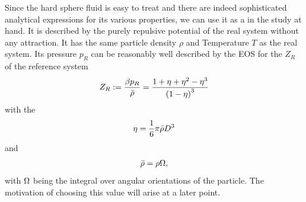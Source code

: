 \documentclass[8.5pt,twoside,twocolumn]{article}
\theoremstyle{standard}
\begin{document}
Since the hard sphere fluid is easy to treat and there are indeed sophisticated analytical
expressions for its various properties, we can use it as a  in the
study at hand. It is described by the purely repulsive potential of the real system
without any attraction. It has the same particle density $\rho$ and Temperature $T$ as the
real system. Its pressure $p_R$ can be reasonably well described by the 
EOS\cite{CarnahanStarling} for the  $Z_R$ of the reference system
\begin{equation}
Z_R:=\frac{\beta p_R}{\bar\rho}=\frac{1+\eta+\eta^2-\eta^3}{\left({1-\eta}\right)^3}
\label{TPT:CSEOS}
\end{equation}
with the 
\begin{equation}
\eta=\frac 1 6 \pi\bar\rho D^3
\label{TPT:eta}
\end{equation}
and
\begin{equation}
\bar\rho=\rho \Omega,
\label{TPT:rhobar}
\end{equation}
with $\Omega$ being the integral over angular orientations of
the particle. The motivation of choosing this value will arise at a later point.
  
\end{document}
